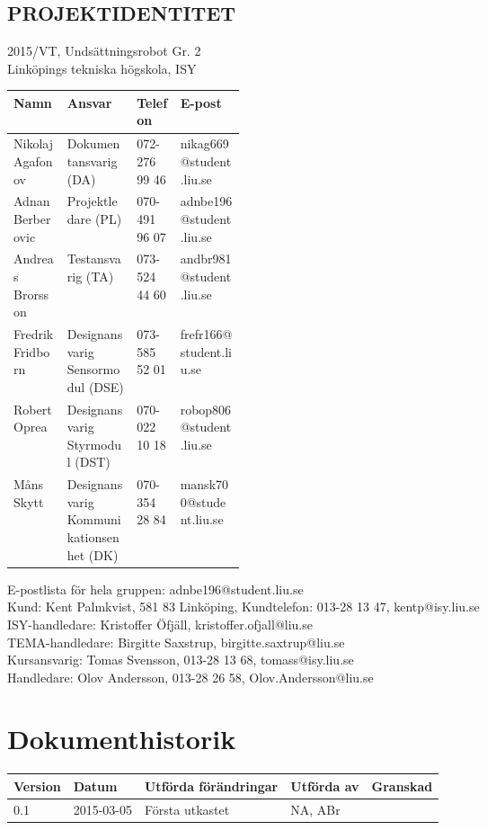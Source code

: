 \documentclass[11pt]{article}
\begin{document}
\pagebreak
\begin{center}

\section*{PROJEKTIDENTITET}
2015/VT, Undsättningsrobot Gr. 2
\\
Linköpings tekniska högskola, ISY
\\[0.5in]
\begin{table}[h]
\begin{tabular}{|l|p{0.3\linewidth}|l|l|} \hline
Namn & Ansvar & Telefon & E-post \\[0.1in] \hline
Nikolaj Agafonov & Dokumentansvarig (DA) & 072-276 99 46 & nikag669@student.liu.se \\ \hline
Adnan Berberovic & Projektledare (PL) & 070-491 96 07 & adnbe196@student.liu.se \\ \hline
Andreas Brorsson & Testansvarig (TA) & 073-524 44 60 & andbr981@student.liu.se \\ \hline
Fredrik Fridborn & Designansvarig Sensormodul (DSE) & 073-585 52 01 & frefr166@student.liu.se \\ \hline
Robert Oprea & Designansvarig Styrmodul (DST) & 070-022 10 18 & robop806@student.liu.se \\ \hline
Måns Skytt & Designansvarig Kommunikationsenhet (DK) & 070-354 28 84 & mansk700@student.liu.se \\ \hline
\end{tabular}
\end{table}


E-postlista för hela gruppen: adnbe196@student.liu.se
\\[1in]
Kund: Kent Palmkvist, 581 83 Linköping,
Kundtelefon: 013-28 13 47, kentp@isy.liu.se
\\
ISY-handledare: Kristoffer Öfjäll, kristoffer.ofjall@liu.se
\\
TEMA-handledare: Birgitte Saxstrup, birgitte.saxtrup@liu.se
\\[1in]
Kursansvarig: Tomas Svensson, 013-28 13 68, tomass@isy.liu.se
\\
Handledare: Olov Andersson, 013-28 26 58, Olov.Andersson@liu.se
\end{center}
\pagebreak

\tableofcontents

\pagebreak

\section*{Dokumenthistorik}
\begin{table}[h]
\begin{tabular}{|l|l|l|l|l|} \hline

Version & 
Datum & 
Utförda förändringar & 
Utförda av & 
Granskad \\[0.1in] \hline
0.1 &
2015-03-05 & 
Första utkastet & 
NA, ABr & 
\\ \hline

\end{tabular}
\end{table}
\end{document}
